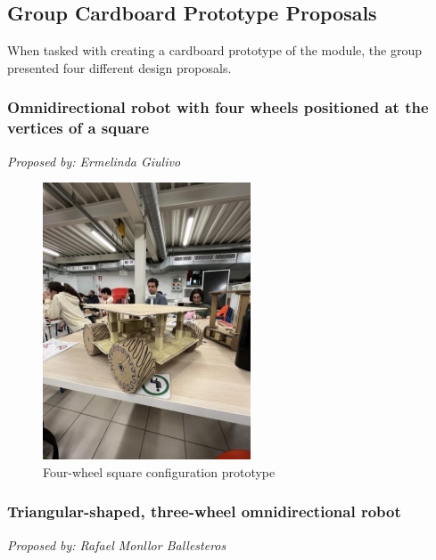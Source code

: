 \subsection{Group Cardboard Prototype Proposals}

When tasked with creating a cardboard prototype of the module, the group presented four different design proposals.

\subsubsection{Omnidirectional robot with four wheels positioned at the vertices of a square}
\textit{Proposed by: Ermelinda Giulivo}

\begin{figure}[H]
    \centering
    \includegraphics[width=0.6\linewidth]{../ReportMovementModule/images/Aspose.Words.728084da-df58-4b9d-a372-f65cffbdb23d.002.jpeg}
    \caption{Four-wheel square configuration prototype}
\end{figure}

\subsubsection{Triangular-shaped, three-wheel omnidirectional robot}
\textit{Proposed by: Rafael Monllor Ballesteros}

